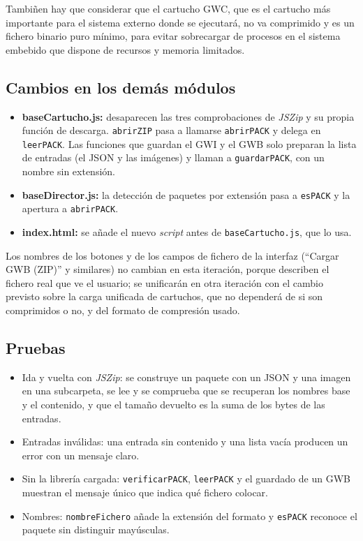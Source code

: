 Tambiñen hay que considerar que el cartucho GWC, que es el cartucho más importante para el sistema externo donde se ejecutará, no va comprimido y es un fichero binario puro mínimo, para evitar sobrecargar de procesos en el sistema embebido que dispone de recursos y memoria limitados.

\subsection{Cambios en los demás módulos}
\label{sec:F5I11Cambios}

\begin{itemize}
	\item \textbf{baseCartucho.js:} desaparecen las tres comprobaciones de \emph{JSZip} y su propia función de descarga. \texttt{abrirZIP} pasa a llamarse \texttt{abrirPACK} y delega en \texttt{leerPACK}. Las funciones que guardan el GWI y el GWB solo preparan la lista de entradas (el JSON y las imágenes) y llaman a \texttt{guardarPACK}, con un nombre sin extensión.
	\item \textbf{baseDirector.js:} la detección de paquetes por extensión pasa a \texttt{esPACK} y la apertura a \texttt{abrirPACK}.
	\item \textbf{index.html:} se añade el nuevo \emph{script} antes de \texttt{baseCartucho.js}, que lo usa.
\end{itemize}

Los nombres de los botones y de los campos de fichero de la interfaz (``Cargar GWB (ZIP)'' y similares) no cambian en esta iteración, porque describen el fichero real que ve el usuario; se unificarán en otra iteración con el cambio previsto sobre la carga unificada de cartuchos, que no dependerá de si son comprimidos o no, y del formato de compresión usado.

\subsection{Pruebas}
\label{sec:F5I11Pruebas}

\begin{itemize}
	\item Ida y vuelta con \emph{JSZip}: se construye un paquete con un JSON y una imagen en una subcarpeta, se lee y se comprueba que se recuperan los nombres base y el contenido, y que el tamaño devuelto es la suma de los bytes de las entradas.
	\item Entradas inválidas: una entrada sin contenido y una lista vacía producen un error con un mensaje claro.
	\item Sin la librería cargada: \texttt{verificarPACK}, \texttt{leerPACK} y el guardado de un GWB muestran el mensaje único que indica qué fichero colocar.
	\item Nombres: \texttt{nombreFichero} añade la extensión del formato y \texttt{esPACK} reconoce el paquete sin distinguir mayúsculas.
\end{itemize}

